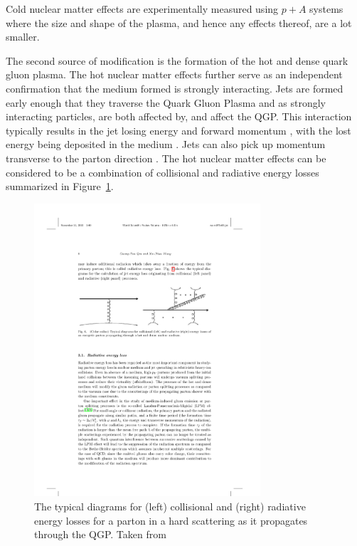 Cold nuclear matter effects are experimentally measured using $p+A$ systems where the size and shape of the plasma, and hence any effects thereof, are a lot smaller. 

The second source of modification is the formation of the hot and dense quark gluon plasma. The hot nuclear matter effects further serve as an independent confirmation that the medium formed is strongly interacting. Jets are formed early enough that they traverse the Quark Gluon Plasma and as strongly interacting particles, are both affected by, and affect the QGP. This interaction typically results in the jet losing energy and forward momentum \cite{2012176, ATLAS:2017wvp}, with the lost energy being deposited in the medium \cite{Khachatryan2016}. Jets can also pick up momentum transverse to the parton direction \cite{Chatrchyan:2012nia}. The hot nuclear matter effects can be considered to be a combination of collisional and radiative energy losses summarized in Figure~\ref{fig:jetEnergyLoss}.

\begin{figure}[htbp]
\begin{center}
\includegraphics[width=0.75\textwidth]{figures/theory/jetEnergyLoss}
\caption{The typical diagrams for (left) collisional and (right) radiative energy losses for a parton in a hard scattering as it propagates through the QGP. Taken from \cite{Qin:2015srf}}
\label{fig:jetEnergyLoss}
\end{center}
\end{figure}

